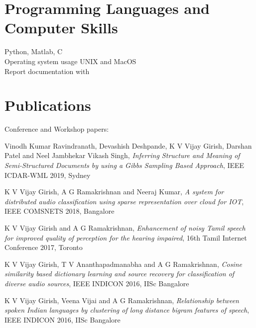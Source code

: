 \documentclass[line]{resume}
\begin{document}
{\begin{resume}
						
			\vspace{-3.5mm}
			\section{\mysidestyle Programming Languages and Computer Skills} 
			\vspace{2.5mm}
			 Python, Matlab, C \vspace{1mm}\\
			Operating system usage UNIX and MacOS \vspace{1mm}\\
			Report documentation with \LaTeXe
			\vspace{-2.5mm}
			\section{\mysidestyle Publications}
			\vspace{1.5mm}
			Conference  and Workshop papers:
			\begin{list2}
			\item Vinodh Kumar Ravindranath, Devashish Deshpande, K V Vijay Girish, Darshan Patel and Neel Jambhekar
Vikash Singh, \textit{ Inferring Structure and Meaning of Semi-Structured Documents by using a Gibbs Sampling Based Approach}, IEEE ICDAR-WML 2019, Sydney
					\item K V Vijay Girish, A G Ramakrishnan and Neeraj Kumar, \textit{A system for distributed audio classification using sparse representation over cloud for IOT}, IEEE COMSNETS 2018, Bangalore
			
			\item K V Vijay Girish and A G Ramakrishnan, \textit{Enhancement of noisy Tamil speech for improved quality of perception for the hearing impaired}, 16th Tamil Internet Conference 2017, Toronto
					
				\item  K V Vijay Girish, T V Ananthapadmanabha and A G Ramakrishnan,  \textit{Cosine similarity based dictionary learning and source recovery for classification of diverse audio sources}, IEEE INDICON 2016, IISc Bangalore
					
				
				\item  K V Vijay Girish, Veena Vijai and A G Ramakrishnan,  \textit{Relationship between spoken Indian languages by clustering of long distance bigram features of speech},  IEEE INDICON 2016, IISc Bangalore
				

\end{list2}
\end{resume}}
\end{document}
